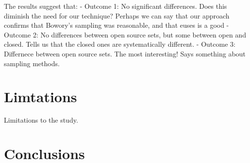 \documentclass[conference]{IEEEtran}
\begin{document}
The results suggest that:
- Outcome 1: No significant differences. Does this diminish the need for our technique?
  Perhaps we can say that our approach confirms that Bowory's sampling was reasonable,
  and that euses is a good 
- Outcome 2: No differences between open source sets, but some between open and closed. 
  Tells us that the closed ones are systematically different.
- Outcome 3: Differnece between open source sets. The most interesting! Says something about 
  sampling methods.


\section{Limtations}

Limitations to the study.

\section{Conclusions}



%
%



%
%
\end{document}

